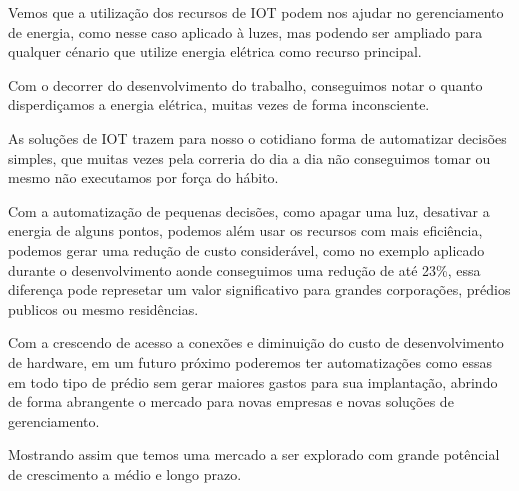 \documentclass[openright]{normas-utf-tex} %
\begin{document}
Vemos que a utilização dos recursos de IOT podem nos ajudar no gerenciamento de energia, como nesse caso aplicado à luzes, mas podendo ser ampliado para qualquer cénario que utilize energia elétrica como recurso principal.

Com o decorrer do desenvolvimento do trabalho, conseguimos notar o quanto disperdiçamos a energia elétrica, muitas vezes de forma inconsciente.   

As soluções de IOT trazem para nosso o cotidiano forma de automatizar decisões simples, que muitas vezes pela correria do dia a dia não conseguimos tomar ou mesmo não executamos por força do hábito. 

Com a automatização de pequenas decisões, como apagar uma luz, desativar a energia de alguns pontos, podemos além usar os recursos com mais eficiência, podemos gerar uma redução de custo considerável, como no exemplo aplicado durante o desenvolvimento aonde conseguimos uma redução de até 23\%, essa diferença pode represetar um valor significativo para grandes corporações, prédios publicos ou mesmo residências.

Com a crescendo de acesso a conexões e diminuição do custo de desenvolvimento de hardware, em um futuro próximo poderemos ter automatizações como essas em todo tipo de prédio sem gerar maiores gastos para sua implantação, abrindo de forma abrangente o mercado para novas empresas e novas soluções de gerenciamento.

Mostrando assim que temos uma mercado a ser explorado com grande potêncial de crescimento a médio e longo prazo.

\label{bibstart}
\label{bibend}

%
%
%
%
\end{document}
